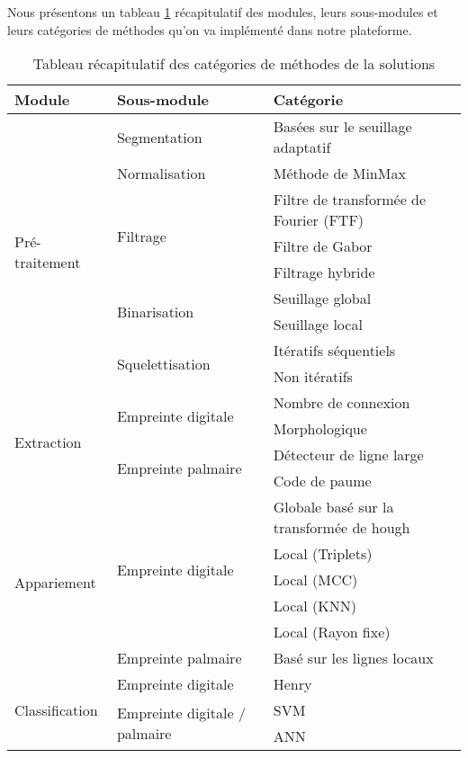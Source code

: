 Nous présentons un tableau \ref{mehodesimplted} récapitulatif des modules, leurs sous-modules et leurs catégories de méthodes qu'on va implémenté dans notre plateforme.
\begin{table}[H]
	\centering
	\label{mehodesimplted}
	\begin{tabular}{|l|l|l|}
		\hline
		\textbf{Module} & \textbf{Sous-module} & \textbf{Catégorie} \\ \hline
		\multirow{9}{*}{Pré-traitement} & Segmentation & Basées sur le seuillage adaptatif \\ \cline{2-3} 
		& Normalisation & Méthode de MinMax \\ \cline{2-3} 
		& \multirow{3}{*}{Filtrage} & Filtre de transformée de Fourier (FTF) \\ \cline{3-3} 
		&  & Filtre de Gabor \\ \cline{3-3} 
		&  & Filtrage hybride \\ \cline{2-3} 
		& \multirow{2}{*}{Binarisation} & Seuillage global \\ \cline{3-3} 
		&  & Seuillage local \\ \cline{2-3} 
		& \multirow{2}{*}{Squelettisation} & Itératifs séquentiels \\ \cline{3-3} 
		&  & Non itératifs \\ \hline
		\multirow{4}{*}{Extraction} & \multirow{2}{*}{Empreinte digitale} & Nombre de connexion \\ \cline{3-3} 
		&  & Morphologique \\ \cline{2-3} 
		& \multirow{2}{*}{Empreinte palmaire} & Détecteur de ligne large \\ \cline{3-3} 
		&  & Code de paume \\ \hline
		\multirow{6}{*}{Appariement} & \multirow{5}{*}{Empreinte digitale} & Globale basé sur la transformée de hough \\ \cline{3-3} 
		&  & Local (Triplets) \\ \cline{3-3} 
		&  & Local (MCC) \\ \cline{3-3} 
		&  & Local (KNN) \\ \cline{3-3} 
		&  & Local (Rayon fixe) \\ \cline{2-3} 
		& Empreinte palmaire & Basé sur les lignes locaux \\ \hline
		\multirow{3}{*}{Classification} & Empreinte digitale & Henry \\ \cline{2-3} 
		& \multirow{2}{*}{Empreinte digitale / palmaire} & SVM \\ \cline{3-3} 
		&  & ANN \\ \hline
	\end{tabular}
	\caption{Tableau récapitulatif des catégories de méthodes de la solutions}
\end{table}
\clearpage
